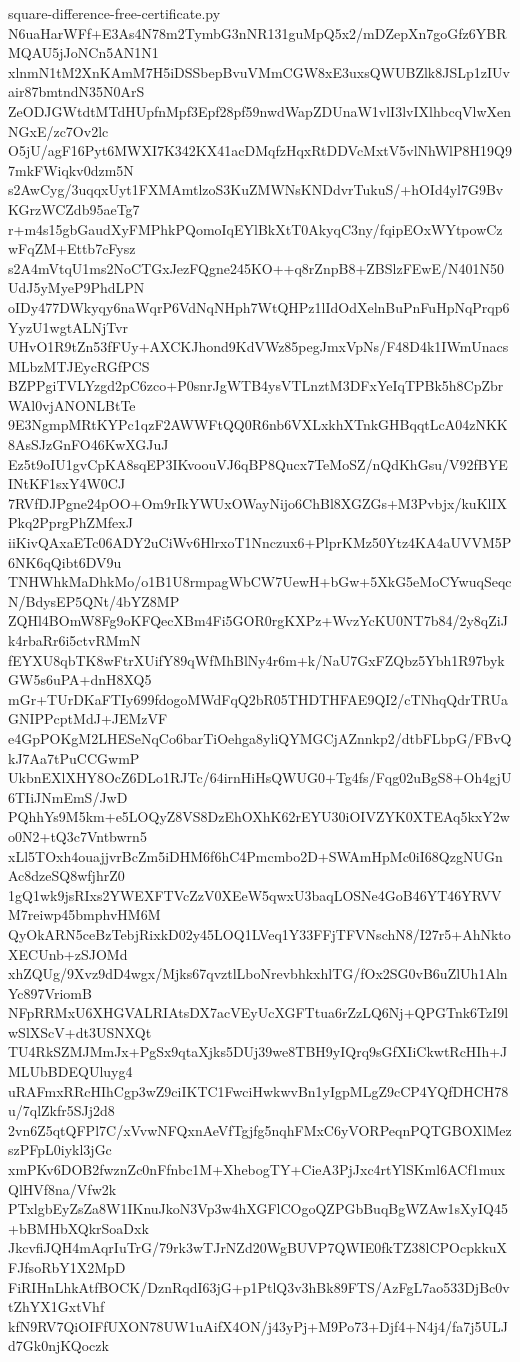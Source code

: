 \documentclass[11pt]{article}
\theoremstyle{definition}
\theoremstyle{remark}
\begin{document}
\begin{filecontents*}[overwrite]{square-difference-free-certificate.py}
N6uaHarWFf+E3As4N78m2TymbG3nNR131guMpQ5x2/mDZepXn7goGfz6YBRMQAU5jJoNCn5AN1N1
xlnmN1tM2XnKAmM7H5iDSSbepBvuVMmCGW8xE3uxsQWUBZlk8JSLp1zIUvair87bmtndN35N0ArS
ZeODJGWtdtMTdHUpfnMpf3Epf28pf59nwdWapZDUnaW1vlI3lvIXlhbcqVlwXenNGxE/zc7Ov2lc
O5jU/agF16Pyt6MWXI7K342KX41acDMqfzHqxRtDDVcMxtV5vlNhWlP8H19Q97mkFWiqkv0dzm5N
s2AwCyg/3uqqxUyt1FXMAmtlzoS3KuZMWNsKNDdvrTukuS/+hOId4yl7G9BvKGrzWCZdb95aeTg7
r+m4s15gbGaudXyFMPhkPQomoIqEYlBkXtT0AkyqC3ny/fqipEOxWYtpowCzwFqZM+Ettb7cFysz
s2A4mVtqU1ms2NoCTGxJezFQgne245KO++q8rZnpB8+ZBSlzFEwE/N401N50UdJ5yMyeP9PhdLPN
oIDy477DWkyqy6naWqrP6VdNqNHph7WtQHPz1lIdOdXelnBuPnFuHpNqPrqp6YyzU1wgtALNjTvr
UHvO1R9tZn53fFUy+AXCKJhond9KdVWz85pegJmxVpNs/F48D4k1IWmUnacsMLbzMTJEycRGfPCS
BZPPgiTVLYzgd2pC6zco+P0snrJgWTB4ysVTLnztM3DFxYeIqTPBk5h8CpZbrWAl0vjANONLBtTe
9E3NgmpMRtKYPc1qzF2AWWFtQQ0R6nb6VXLxkhXTnkGHBqqtLcA04zNKK8AsSJzGnFO46KwXGJuJ
Ez5t9oIU1gvCpKA8sqEP3IKvoouVJ6qBP8Qucx7TeMoSZ/nQdKhGsu/V92fBYEINtKF1sxY4W0CJ
7RVfDJPgne24pOO+Om9rIkYWUxOWayNijo6ChBl8XGZGs+M3Pvbjx/kuKlIXPkq2PprgPhZMfexJ
iiKivQAxaETc06ADY2uCiWv6HlrxoT1Nnczux6+PlprKMz50Ytz4KA4aUVVM5P6NK6qQibt6DV9u
TNHWhkMaDhkMo/o1B1U8rmpagWbCW7UewH+bGw+5XkG5eMoCYwuqSeqcN/BdysEP5QNt/4bYZ8MP
ZQHl4BOmW8Fg9oKFQecXBm4Fi5GOR0rgKXPz+WvzYcKU0NT7b84/2y8qZiJk4rbaRr6i5ctvRMmN
fEYXU8qbTK8wFtrXUifY89qWfMhBlNy4r6m+k/NaU7GxFZQbz5Ybh1R97bykGW5s6uPA+dnH8XQ5
mGr+TUrDKaFTIy699fdogoMWdFqQ2bR05THDTHFAE9QI2/cTNhqQdrTRUaGNIPPcptMdJ+JEMzVF
e4GpPOKgM2LHESeNqCo6barTiOehga8yliQYMGCjAZnnkp2/dtbFLbpG/FBvQkJ7Aa7tPuCCGwmP
UkbnEXlXHY8OcZ6DLo1RJTc/64irnHiHsQWUG0+Tg4fs/Fqg02uBgS8+Oh4gjU6TIiJNmEmS/JwD
PQhhYs9M5km+e5LOQyZ8VS8DzEhOXhK62rEYU30iOIVZYK0XTEAq5kxY2wo0N2+tQ3c7Vntbwrn5
xLl5TOxh4ouajjvrBcZm5iDHM6f6hC4Pmcmbo2D+SWAmHpMc0iI68QzgNUGnAc8dzeSQ8wfjhrZ0
1gQ1wk9jsRIxs2YWEXFTVcZzV0XEeW5qwxU3baqLOSNe4GoB46YT46YRVVM7reiwp45bmphvHM6M
QyOkARN5ceBzTebjRixkD02y45LOQ1LVeq1Y33FFjTFVNschN8/I27r5+AhNktoXECUnb+zSJOMd
xhZQUg/9Xvz9dD4wgx/Mjks67qvztlLboNrevbhkxhlTG/fOx2SG0vB6uZlUh1AlnYc897VriomB
NFpRRMxU6XHGVALRIAtsDX7acVEyUcXGFTtua6rZzLQ6Nj+QPGTnk6TzI9lwSlXScV+dt3USNXQt
TU4RkSZMJMmJx+PgSx9qtaXjks5DUj39we8TBH9yIQrq9sGfXIiCkwtRcHIh+JMLUbBDEQUluyg4
uRAFmxRRcHIhCgp3wZ9ciIKTC1FwciHwkwvBn1yIgpMLgZ9cCP4YQfDHCH78u/7qlZkfr5SJj2d8
2vn6Z5qtQFPl7C/xVvwNFQxnAeVfTgjfg5nqhFMxC6yVORPeqnPQTGBOXlMezszPFpL0iykl3jGc
xmPKv6DOB2fwznZc0nFfnbc1M+XhebogTY+CieA3PjJxc4rtYlSKml6ACf1muxQlHVf8na/Vfw2k
PTxlgbEyZsZa8W1IKnuJkoN3Vp3w4hXGFlCOgoQZPGbBuqBgWZAw1sXyIQ45+bBMHbXQkrSoaDxk
JkcvfiJQH4mAqrIuTrG/79rk3wTJrNZd20WgBUVP7QWIE0fkTZ38lCPOcpkkuXFJfsoRbY1X2MpD
FiRIHnLhkAtfBOCK/DznRqdI63jG+p1PtlQ3v3hBk89FTS/AzFgL7ao533DjBc0vtZhYX1GxtVhf
kfN9RV7QiOIFfUXON78UW1uAifX4ON/j43yPj+M9Po73+Djf4+N4j4/fa7j5ULJd7Gk0njKQoczk

\end{filecontents*}
\end{document}
